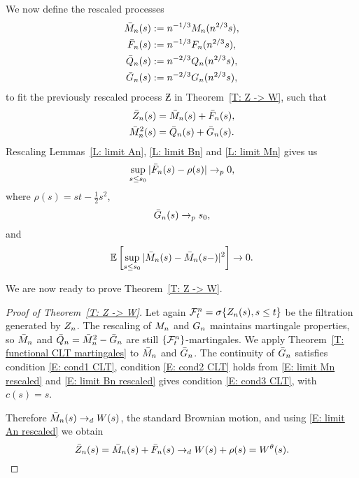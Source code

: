 We now define the rescaled processes 
\begin{equation}
\begin{aligned}
\bar{M}_n(s) &:= n^{-1 / 3}M_n(n^{2 / 3}s), \\
\bar{F}_n(s) &:= n^{-1 / 3}F_n(n^{2 / 3}s), \\
\bar{Q}_n(s) &:= n^{-2 / 3}Q_n(n^{2 / 3}s), \\
\bar{G}_n(s) &:= n^{-2 / 3}G_n(n^{2 / 3}s),
\end{aligned} 	
\end{equation}
to fit the previously rescaled process 
$\Zbar$ in Theorem~\ref{T: Z -> W}, such that
\begin{equation}
\begin{aligned}
\bar{Z}_n(s) &= \bar{M}_n(s) + \bar{F}_n(s), \\
\bar{M}_n^2(s) &= \bar{Q}_n(s) + \bar{G}_n(s).
\end{aligned}	
\end{equation}
Rescaling Lemmas~\ref{L: limit An}, \ref{L: limit Bn} and \ref{L: limit Mn} gives us
\begin{equation} \label{E: limit An rescaled}
\sup_{s \leq s_0} |\bar{F}_n(s) - \rho (s)| \rightarrow_p 0,
\end{equation}
where $\rho (s) = st - \frac{1}{2}s^2$,
\begin{equation} \label{E: limit Bn rescaled}
\bar{G}_n(s) \rightarrow_p s_0,
\end{equation}
and
\begin{equation} \label{E: limit Mn rescaled}
\mathbb{E} \left[ \sup_{s \leq s_0} | \bar{M}_n(s) - \bar{M}_n(s-) |^2  \right] \rightarrow 0.
\end{equation}

We are now ready to prove Theorem~\ref{T: Z -> W}.

\begin{proof}[Proof of Theorem~\ref{T: Z -> W}]
	Let again $\mathcal{F}^n_{t} = \sigma \{ Z_n(s), s \leq t \}$ be the filtration generated by $Z_n$.
	The rescaling of $M_n$ and $G_n$ maintains martingale properties,
	so $\bar{M}_n$ and $\bar{Q}_n = \bar{M}_n^2 - \bar{G}_n$ are still $\{\mathcal{F}^n_{t}\}$-martingales.
	We apply Theorem~\ref{T: functional CLT martingales} to $\bar{M}_n$ and $\bar{G}_n$.
	The continuity of $\bar{G}_n$ satisfies condition \eqref{E: cond1 CLT}, 
	condition \eqref{E: cond2 CLT} holds from \eqref{E: limit Mn rescaled}
	and \eqref{E: limit Bn rescaled} gives condition \eqref{E: cond3 CLT}, with $c(s) = s$.
	
	Therefore $\bar{M}_n(s) \rightarrow_d W(s)$, the standard Brownian motion, and using \eqref{E: limit An rescaled} we obtain
	\begin{equation}
	\bar{Z}_n(s) = \bar{M}_n(s) + \bar{F}_n(s) \rightarrow_d W(s) + \rho (s) = W^{\theta}(s).
	\end{equation}
\end{proof}



